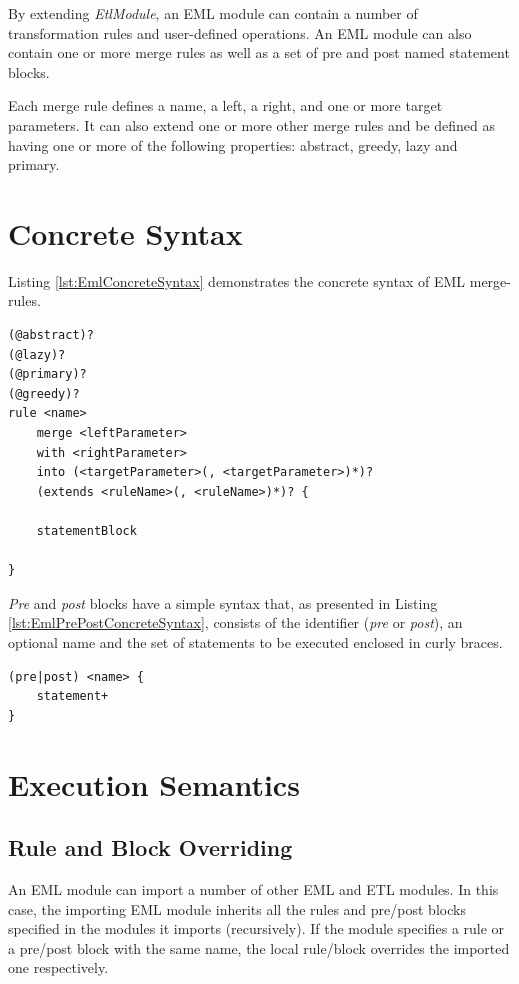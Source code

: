 By extending \emph{EtlModule}, an EML module can contain a number of transformation rules and user-defined operations. An EML module can also contain one or more merge rules as well as a set of pre and post named statement blocks.

Each merge rule defines a name, a left, a right, and one or more target parameters. It can also extend one or more other merge rules and be defined as having one or more of the following properties: abstract, greedy, lazy and primary.

\section{Concrete Syntax}

Listing \ref{lst:EmlConcreteSyntax} demonstrates the concrete syntax of EML merge-rules.

\begin{lstlisting}[float=tbp, caption=Concrete syntax of an EML merge-rule, label=lst:EmlConcreteSyntax, language=EML]
(@abstract)?
(@lazy)?
(@primary)?
(@greedy)?
rule <name>
	merge <leftParameter>
	with <rightParameter>
	into (<targetParameter>(, <targetParameter>)*)?
	(extends <ruleName>(, <ruleName>)*)? {

	statementBlock
	
}
\end{lstlisting}

\emph{Pre} and \emph{post} blocks have a simple syntax that, as presented in Listing \ref{lst:EmlPrePostConcreteSyntax}, consists of the identifier (\emph{pre} or \emph{post}), an optional name and the set of statements to be executed enclosed in curly braces.

\begin{lstlisting}[float=tbp, caption=Concrete Syntax of Pre and Post blocks, label=lst:EmlPrePostConcreteSyntax, language=EML]
(pre|post) <name> {
	statement+
}
\end{lstlisting}

\section{Execution Semantics}

\subsection{Rule and Block Overriding}
An EML module can import a number of other EML and ETL modules. In this case, the importing EML module inherits all the rules and pre/post blocks specified in the modules it imports (recursively). If the module specifies a rule or a pre/post block with the same name, the local rule/block overrides the imported one respectively.

